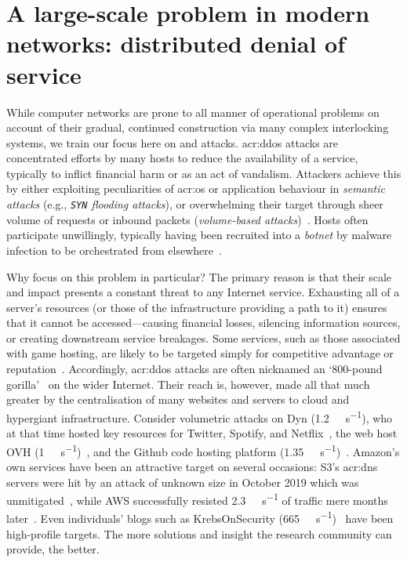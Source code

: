 \section{A large-scale problem in modern networks: distributed denial of service}\label{sec:problems-in-modern-networks}
While computer networks are prone to all manner of operational problems on account of their gradual, continued construction via many complex interlocking systems, we train our focus here on  and  attacks.
\gls{acr:ddos} attacks are concentrated efforts by many hosts to reduce the availability of a service, typically to inflict financial harm or as an act of vandalism.
Attackers achieve this by either exploiting peculiarities of \gls{acr:os} or application behaviour in \emph{semantic attacks} (e.g., \emph{\texttt{SYN} flooding attacks}), or overwhelming their target through sheer volume of requests or inbound packets (\emph{volume-based attacks})~\parencite{DBLP:conf/imc/JonkerKKRSD17}.
Hosts often participate unwillingly, typically having been recruited into a \emph{botnet} by malware infection to be orchestrated from elsewhere~\parencite{DBLP:conf/uss/AntonakakisABBB17}.

Why focus on this problem in particular?
The primary reason is that their scale and impact presents a constant threat to any Internet service.
Exhausting all of a server's resources (or those of the infrastructure providing a path to it) ensures that it cannot be accessed---causing financial losses, silencing information sources, or creating downstream service breakages.
Some services, such as those associated with game hosting, are likely to be targeted simply for competitive advantage or reputation~\parencite{aws-shield-review-2020}.
Accordingly, \gls{acr:ddos} attacks are often nicknamed an `800-pound gorilla'~\parencite{DBLP:conf/imc/CzyzKGPBK14} on the wider Internet.
Their reach is, however, made all that much greater by the centralisation of many websites and servers to cloud and hypergiant infrastructure.
Consider volumetric attacks on Dyn (\qty{1.2}{\tera\bit\per\second}), who at that time hosted key resources for Twitter, Spotify, and Netflix~\parencite{dyn-ddos-2016}, the web host OVH (\qty{1}{\tera\bit\per\second})~\parencite{ovh-ddos-2016}, and the Github code hosting platform (\qty{1.35}{\tera\bit\per\second})~\parencite{github-ddos-2018}.
Amazon's own services have been an attractive target on several occasions: S3's \gls{acr:dns} servers were hit by an attack of unknown size in October 2019 which was unmitigated~\parencite{amazon-s3-2019-ddos}, while AWS successfully resisted \qty{2.3}{\tera\bit\per\second} of traffic mere months later~\parencite{aws-shield-2020-q1}.
Even individuals' blogs such as KrebsOnSecurity (\qty{665}{\giga\bit\per\second})~\parencite{krebs-ddos-2016} have been high-profile targets.
The more solutions and insight the research community can provide, the better.

